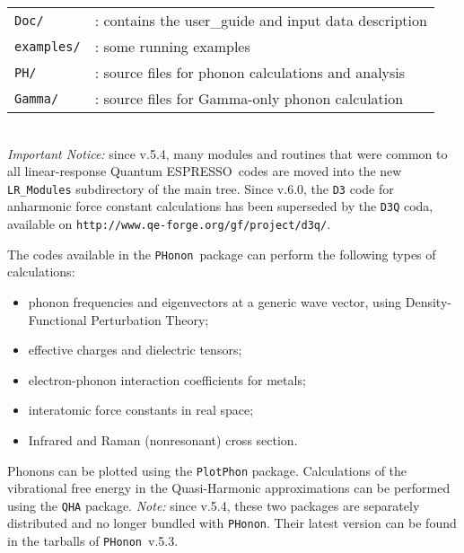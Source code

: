 \documentclass[12pt,a4paper]{article}
\def\qe{{\sc Quantum ESPRESSO}}
\def\PHonon{\texttt{PHonon}}
\begin{document}
\begin{tabular}{ll}
\texttt{Doc/} & : contains the user\_guide and input data description \\
\texttt{examples/} & : some running examples \\
\texttt{PH/}      & : source files for phonon calculations 
                   and analysis\\
\texttt{Gamma/}  & : source files for Gamma-only phonon calculation\\
\end{tabular}\\
{\em Important Notice:} since v.5.4, many modules and routines that were
common to all linear-response \qe\ codes are moved into the new 
\texttt{LR\_Modules} subdirectory of the main tree. Since v.6.0, the
\texttt{D3} code for anharmonic force constant calculations has been 
superseded by the \texttt{D3Q} coda, available on 
\texttt{http://www.qe-forge.org/gf/project/d3q/}.

The codes available in the \PHonon\ package can perform the following 
types of calculations:
\begin{itemize}
  \item phonon frequencies and eigenvectors at a generic wave vector,
  using Density-Functional Perturbation Theory;
  \item effective charges and dielectric tensors;
  \item electron-phonon interaction coefficients for metals;
  \item interatomic force constants in real space;
  \item Infrared and Raman (nonresonant) cross section.
\end{itemize}

Phonons can be plotted using the \texttt{PlotPhon} package.
Calculations of the vibrational free energy in the Quasi-Harmonic 
approximations can be performed using the \texttt{QHA}  package.
{\em Note:} since v.5.4, these two packages are separately distributed
and no longer bundled with \PHonon. Their latest version can be 
found in the tarballs of \PHonon\ v.5.3.
\end{document}
